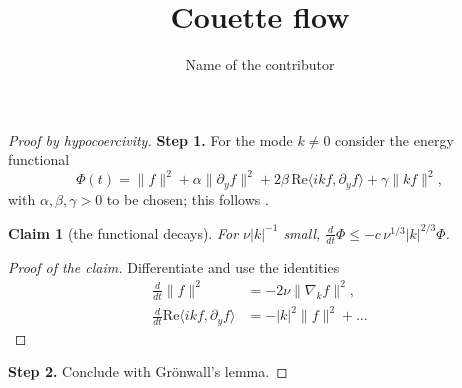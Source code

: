 \documentclass[11pt]{article}
\newtheorem*{claim}{Claim}
\theoremstyle{definition}
\theoremstyle{remark}
\begin{document}
\title{Couette flow}
\author{Name of the contributor}
\date{}
\maketitle

\begin{proof}[Proof by hypocoercivity]\label{proof-couette-hypocoercivity}
\textbf{Step 1.} For the mode $k\neq0$ consider the energy functional
\[
  \Phi(t)=\|f\|^2+\alpha\|\partial_y f\|^2+2\beta\,\mathrm{Re}\langle ik f,\partial_y f\rangle
          +\gamma\|k f\|^2 ,
\]
with $\alpha,\beta,\gamma>0$ to be chosen; this follows
\citet{BedrossianCotiZelati2017}.
\begin{claim}[the functional decays]\label{clm-couette-hypo}
For $\nu|k|^{-1}$ small, $\frac{d}{dt}\Phi\le -c\,\nu^{1/3}|k|^{2/3}\Phi$.
\end{claim}
\begin{proof}[Proof of the claim]\label{proof-clm-couette-hypo}
Differentiate and use the identities
\begin{align*}
\frac{d}{dt}\|f\|^2 &= -2\nu\|\nabla_k f\|^2,\\
\frac{d}{dt}\mathrm{Re}\langle ikf,\partial_y f\rangle &= -|k|^2\|f\|^2+\dots
\end{align*}
\end{proof}
\textbf{Step 2.} Conclude with Grönwall's lemma.
\end{proof}
\end{document}
